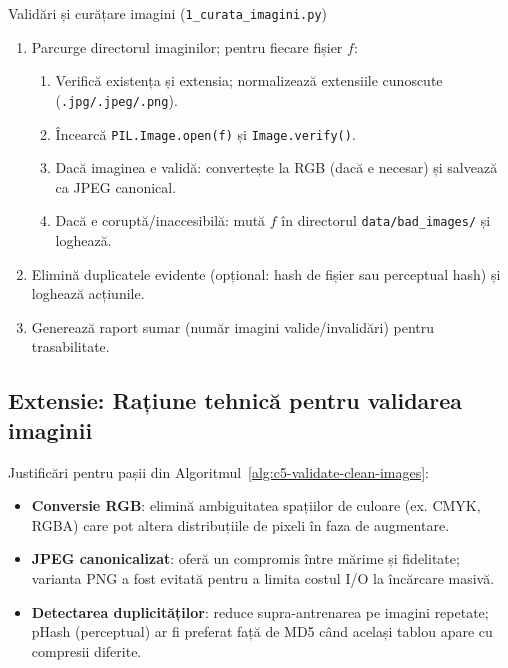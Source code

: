 \begin{algorithm}[H]
\caption{Validări și curățare imagini (\texttt{1\_curata\_imagini.py})}
\label{alg:c5-validate-clean-images}
\begin{enumerate}
  \item Parcurge directorul imaginilor; pentru fiecare fișier $f$:
  \begin{enumerate}
    \item Verifică existența și extensia; normalizează extensiile cunoscute (\texttt{.jpg/.jpeg/.png}).
    \item Încearcă \texttt{PIL.Image.open(f)} și \texttt{Image.verify()}.
    \item Dacă imaginea e validă: convertește la RGB (dacă e necesar) și salvează ca JPEG canonical.
    \item Dacă e coruptă/inaccesibilă: mută $f$ în directorul \texttt{data/bad\_images/} și loghează.
  \end{enumerate}
  \item Elimină duplicatele evidente (opțional: hash de fișier sau perceptual hash) și loghează acțiunile.
  \item Generează raport sumar (număr imagini valide/invalidări) pentru trasabilitate.
\end{enumerate}
\end{algorithm}

\subsection*{Extensie: Rațiune tehnică pentru validarea imaginii}
\noindent Justificări pentru pașii din Algoritmul~\ref{alg:c5-validate-clean-images}:
\begin{itemize}
  \item \textbf{Conversie RGB}: elimină ambiguitatea spațiilor de culoare (ex. CMYK, RGBA) care pot altera distribuțiile de pixeli în faza de augmentare.
  \item \textbf{JPEG canonicalizat}: oferă un compromis între mărime și fidelitate; varianta PNG a fost evitată pentru a limita costul I/O la încărcare masivă.
  \item \textbf{Detectarea duplicităților}: reduce supra-antrenarea pe imagini repetate; pHash (perceptual) ar fi preferat față de MD5 când același tablou apare cu compresii diferite.
\end{itemize}

